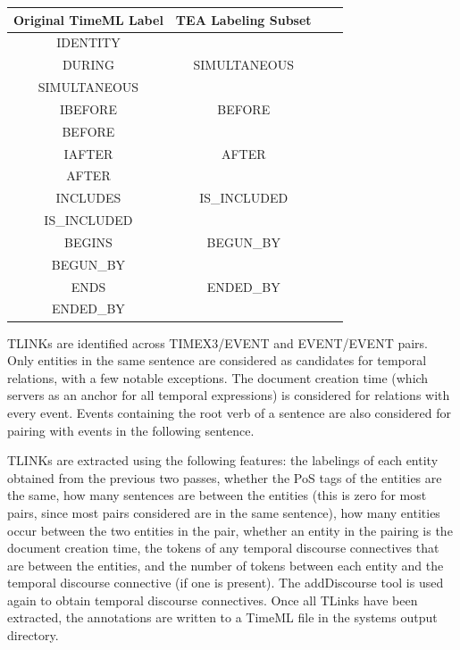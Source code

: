 \documentclass[11pt,letterpaper]{article}
\begin{document}
\begin{center}
	\begin{tabular}{ |c|c|c|c| } 
		\hline
		Original TimeML Label & TEA Labeling Subset \\
		\hline
		IDENTITY &  \\ 
		DURING & SIMULTANEOUS \\ 
		SIMULTANEOUS &  \\ 
		\hline
		IBEFORE & BEFORE \\
		BEFORE & \\
		\hline
		IAFTER & AFTER \\
		AFTER & \\
		\hline
		INCLUDES & IS\_INCLUDED \\
		IS\_INCLUDED & \\
		\hline
		BEGINS & BEGUN\_BY \\
		BEGUN\_BY & \\
		\hline
		ENDS & ENDED\_BY \\
		ENDED\_BY & \\
		\hline
		
	\end{tabular}
\end{center}

\vspace{5mm}

TLINKs are identified across TIMEX3/EVENT and EVENT/EVENT pairs. Only entities in the same sentence are considered as candidates for temporal relations, with a few notable exceptions. The document creation time (which servers as an anchor for all temporal expressions) is considered for relations with every event. Events containing the root verb of a sentence are also considered for pairing with events in the following sentence.

TLINKs are extracted using the following features: the labelings of each entity obtained from the previous two passes, whether the PoS tags of the entities are the same, how many sentences are between the entities (this is zero for most pairs, since most pairs considered are in the same sentence), how many entities occur between the two entities in the pair, whether an entity in the pairing is the document creation time, the tokens of any temporal discourse connectives that are between the entities, and the number of tokens between each entity and the temporal discourse connective (if one is present). The addDiscourse tool is used again to obtain temporal discourse connectives. Once all TLinks have been extracted, the annotations are written to a TimeML file in the systems output directory.
\end{document}
